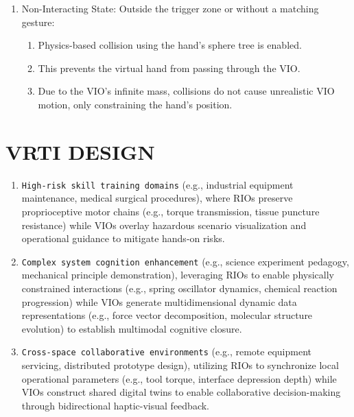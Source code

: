 \documentclass[runningheads]{llncs}
\begin{document}
\begin{enumerate}
\begin{enumerate}
      \item Non-Interacting State: Outside the trigger zone or without a matching gesture: 
      \begin{enumerate}
        \item Physics-based collision using the hand's sphere tree is enabled. 
        \item This prevents the virtual hand from passing through the VIO. 
        \item Due to the VIO's infinite mass, collisions do not cause unrealistic VIO motion, only constraining the hand's position.
      \end{enumerate}
  \end{enumerate}

\end{enumerate}


\section{VRTI DESIGN}


\begin{enumerate}
  \item \texttt{High-risk skill training domains} (e.g., industrial equipment maintenance, medical surgical procedures), where RIOs preserve proprioceptive motor chains (e.g., torque transmission, tissue puncture resistance) while VIOs overlay hazardous scenario visualization and operational guidance to mitigate hands-on risks.
  \item \texttt{Complex system cognition enhancement} (e.g., science experiment pedagogy, mechanical principle demonstration), leveraging RIOs to enable physically constrained interactions (e.g., spring oscillator dynamics, chemical reaction progression) while VIOs generate multidimensional dynamic data representations (e.g., force vector decomposition, molecular structure evolution) to establish multimodal cognitive closure.
  \item \texttt{Cross-space collaborative environments} (e.g., remote equipment servicing, distributed prototype design), utilizing RIOs to synchronize local operational parameters (e.g., tool torque, interface depression depth) while VIOs construct shared digital twins to enable collaborative decision-making through bidirectional haptic-visual feedback.
\end{enumerate}
\end{document}
